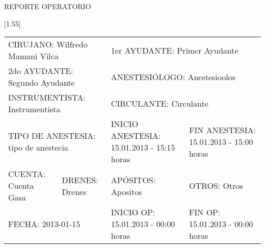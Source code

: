 \documentclass[10pt,a4paper]{article}
\begin{document}
 
\vspace*{2cm}
\hspace{11cm}
\begin{LARGE}
REPORTE OPERATORIO
\end{LARGE}
\vspace{1cm}

\scalebox{1.4}[1.55]{
\begin{tabular}{p{2.8cm}p{2.8cm}p{2.8cm}p{2.8cm}}
\multicolumn{2}{l}{\begin{minipage}[t]{5.5 cm}\scriptsize{CIRUJANO: Wilfredo Mamani Vilca}\end{minipage}}&\multicolumn{2}{l}{\begin{minipage}[t]{5.5 cm}\scriptsize{1er AYUDANTE: Primer Ayudante}\end{minipage}}\\
\multicolumn{2}{l}{\begin{minipage}[t]{5.5 cm}\scriptsize{2do AYUDANTE: Segundo Ayudante}\end{minipage}}&\multicolumn{2}{l}{\begin{minipage}[t]{5.5 cm}\scriptsize{ANESTESI\'OLOGO: Anestesioolos}\end{minipage}}\\
\multicolumn{2}{l}{\begin{minipage}[t]{5.5 cm}\scriptsize{INSTRUMENTISTA: Instrumentista}\end{minipage}}&\multicolumn{2}{l}{\begin{minipage}[t]{5.5 cm}\scriptsize{CIRCULANTE: Circulante}\end{minipage}}\\
\multicolumn{2}{l}{\begin{minipage}[t]{5.5 cm}\scriptsize{TIPO DE ANESTESIA: tipo de anestecia}\end{minipage}} & \scriptsize{INICIO ANESTESIA: 15.01.2013 - 15:15 horas} & \scriptsize{FIN ANESTESIA: 15.01.2013 - 15:00 horas}\\
\scriptsize{CUENTA: Cuenta Gasa} & \scriptsize{DRENES: Drenes} & \scriptsize{AP\'OSITOS: Apositos} &  \scriptsize{OTROS: Otros} \\
\multicolumn{2}{l}{\begin{minipage}[t]{5.5 cm}\scriptsize{FECHA: 2013-01-15}\end{minipage}} & \scriptsize{INICIO OP: 15.01.2013 - 00:00 horas} & \scriptsize{FIN OP: 15.01.2013 - 00:00 horas} \\
\end{tabular}}
\end{document}
